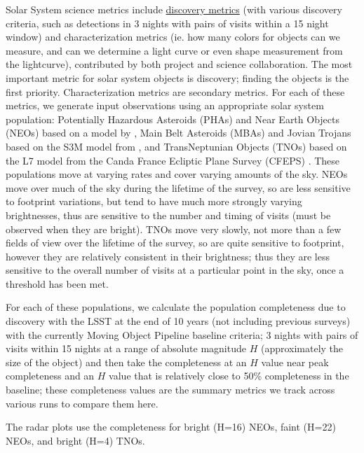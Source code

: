 Solar System science metrics include \href{https://github.com/lsst/sims_maf/blob/master/python/lsst/sims/maf/metrics/moMetrics.py#L215}{discovery metrics} (with various discovery criteria, such as detections in 3 nights with pairs of visits within a 15 night window) and characterization metrics (ie. how many colors for objects can we measure, and can we determine a light curve or even shape measurement from the lightcurve), contributed by both project and science collaboration. The most important metric for solar system objects is discovery; finding the objects is the first priority. Characterization metrics are secondary metrics. For each of these metrics, we generate input observations using an appropriate solar system population: Potentially Hazardous Asteroids (PHAs) and Near Earth Objects (NEOs) based on a model by \citet{2018Icar..312..181G}, Main Belt Asteroids (MBAs) and Jovian Trojans based on the S3M model from \citet{2011PASP..123..423G}, and TransNeptunian Objects (TNOs) based on the L7 model from the Canda France Ecliptic Plane Survey (CFEPS) \citep{2009AJ....137.4917K, 2011AJ....142..131P}. These populations move at varying rates and cover varying amounts of the sky. NEOs move over much of the sky during the lifetime of the survey, so are less sensitive to footprint variations, but tend to have much more strongly varying brightnesses, thus are sensitive to the number and timing of visits (must be observed when they are bright). TNOs move very slowly, not more than a few fields of view over the lifetime of the survey, so are quite sensitive to footprint, however they are relatively consistent in their brightness; thus they are less sensitive to the overall number of visits at a particular point in the sky, once a threshold has been met. 

For each of these populations, we calculate the population completeness due to discovery with the LSST at the end of 10 years (not including previous surveys) with the currently Moving Object Pipeline baseline criteria; 3 nights with pairs of visits within 15 nights at a range of absolute magnitude $H$ (approximately the size of the object) and then take the completeness at an $H$ value near peak completeness and an $H$ value that is relatively close to 50\% completeness in the baseline; these completeness values are the summary metrics we track across various runs to compare them here. 

The radar plots use the completeness for bright (H=16) NEOs, faint (H=22) NEOs, and bright (H=4) TNOs. 


